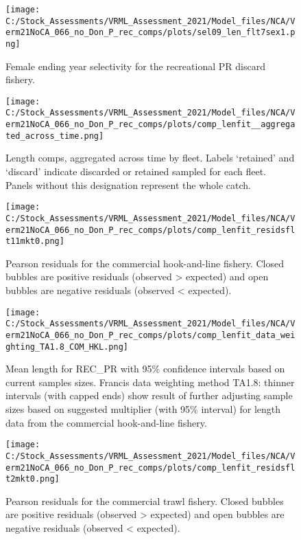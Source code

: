 \documentclass[11pt,
  english,
  a4paper,
]{article}
\begin{document}
\begin{figure}
\centering
\texttt{[image: C:/Stock\_Assessments/VRML\_Assessment\_2021/Model\_files/NCA/Verm21NoCA\_066\_no\_Don\_P\_rec\_comps/plots/sel09\_len\_flt7sex1.png]}
\caption{Female ending year selectivity for the recreational PR discard fishery.\label{fig:endyr-selex-REC-PR-DIS}}
\end{figure}

\FloatBarrier

\FloatBarrier

\begin{figure}
\centering
\texttt{[image: C:/Stock\_Assessments/VRML\_Assessment\_2021/Model\_files/NCA/Verm21NoCA\_066\_no\_Don\_P\_rec\_comps/plots/comp\_lenfit\_\_aggregated\_across\_time.png]}
\caption{Length comps, aggregated across time by fleet. Labels `retained' and `discard' indicate discarded or retained sampled for each fleet. Panels without this designation represent the whole catch.\label{fig:lenfits-all}}
\end{figure}

\begin{figure}
\centering
\texttt{[image: C:/Stock\_Assessments/VRML\_Assessment\_2021/Model\_files/NCA/Verm21NoCA\_066\_no\_Don\_P\_rec\_comps/plots/comp\_lenfit\_residsflt11mkt0.png]}
\caption{Pearson residuals for the commercial hook-and-line fishery. Closed bubbles are positive residuals (observed \textgreater{} expected) and open bubbles are negative residuals (observed \textless{} expected).\label{fig:len-pearson-COM-HKL}}
\end{figure}

\begin{figure}
\centering
\texttt{[image: C:/Stock\_Assessments/VRML\_Assessment\_2021/Model\_files/NCA/Verm21NoCA\_066\_no\_Don\_P\_rec\_comps/plots/comp\_lenfit\_data\_weighting\_TA1.8\_COM\_HKL.png]}
\caption{Mean length for REC\_PR with 95\% confidence intervals based on current samples sizes. Francis data weighting method TA1.8: thinner intervals (with capped ends) show result of further adjusting sample sizes based on suggested multiplier (with 95\% interval) for length data from the commercial hook-and-line fishery.\label{fig:mean-len-fit-COM-HKL}}
\end{figure}

\begin{figure}
\centering
\texttt{[image: C:/Stock\_Assessments/VRML\_Assessment\_2021/Model\_files/NCA/Verm21NoCA\_066\_no\_Don\_P\_rec\_comps/plots/comp\_lenfit\_residsflt2mkt0.png]}
\caption{Pearson residuals for the commercial trawl fishery. Closed bubbles are positive residuals (observed \textgreater{} expected) and open bubbles are negative residuals (observed \textless{} expected).\label{fig:len-pearson-COM-TWL}}
\end{figure}
\end{document}
